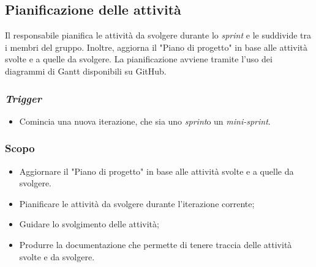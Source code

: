 \subsection{Pianificazione delle attività}
\label{pianificazione-attivia}

Il responsabile pianifica le attività da svolgere durante lo \textit{sprint}
e le suddivide tra i membri del gruppo. Inoltre, aggiorna il "Piano di progetto"
in base alle attività svolte e a quelle da svolgere. La pianificazione avviene
tramite l'uso dei diagrammi di Gantt disponibili su GitHub\g.

\subsubsection{\textit{Trigger}}
\begin{itemize}
	\item Comincia una nuova iterazione, che sia uno \textit{sprint}\g o un
	      \textit{mini-sprint}\g.
\end{itemize}

\subsubsection{Scopo}
\begin{itemize}
	\item Aggiornare il "Piano di progetto" in base alle attività svolte e a
	      quelle da svolgere.

	\item Pianificare le attività da svolgere durante l'iterazione corrente;

	\item Guidare lo svolgimento delle attività;

	\item Produrre la documentazione che permette di tenere traccia delle
	      attività svolte e da svolgere.
\end{itemize}

